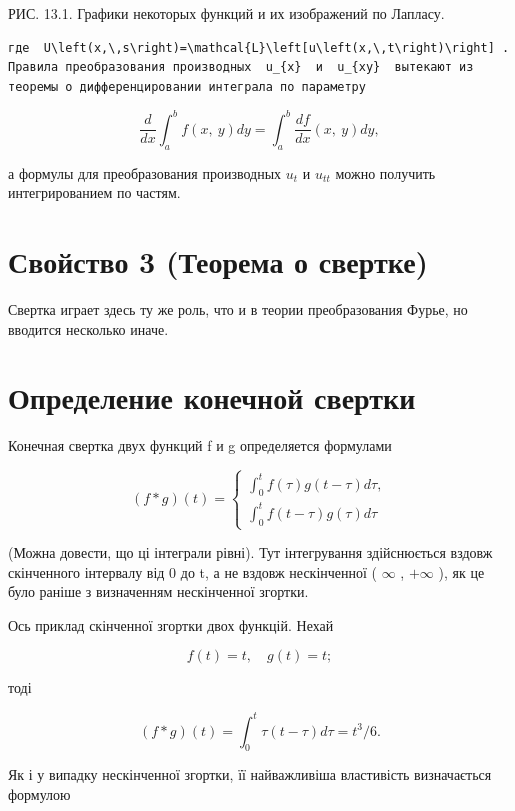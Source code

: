 \documentclass[
  ukrainian,
]{article}
\begin{document}
РИС. 13.1. Графики некоторых функций и их изображений по Лапласу.

\begin{verbatim}
где  U\left(x,\,s\right)=\mathcal{L}\left[u\left(x,\,t\right)\right] . Правила преобразования производных  u_{x}  и  u_{xy}  вытекают из теоремы о дифференцировании интеграла по параметру
\end{verbatim}

\[
\frac{d}{dx}\int_{a}^{b}f\left(x,\ y\right)dy=\int_{a}^{b}\frac{df}{dx}\left(x,\ y\right)dy,
\]

а формулы для преобразования производных \(u_t\) и \(u_{tt}\) можно
получить интегрированием по частям.

\section{Свойство 3 (Теорема о
свертке)}\label{ux441ux432ux43eux439ux441ux442ux432ux43e-3-ux442ux435ux43eux440ux435ux43cux430-ux43e-ux441ux432ux435ux440ux442ux43aux435}

Свертка играет здесь ту же роль, что и в теории преобразования Фурье, но
вводится несколько иначе.

\section{Определение конечной
свертки}\label{ux43eux43fux440ux435ux434ux435ux43bux435ux43dux438ux435-ux43aux43eux43dux435ux447ux43dux43eux439-ux441ux432ux435ux440ux442ux43aux438}

Конечная свертка двух функций f и g определяется формулами

\[
(f * g) (t) =
\begin{cases} \int_0^t f(\tau) g(t-\tau) d\tau, \\ \int_0^t f(t-\tau) g(\tau) d\tau \end{cases}
\]

(Можна довести, що ці інтеграли рівні). Тут інтегрування здійснюється
вздовж скінченного інтервалу від 0 до t, а не вздовж нескінченної (
\(\infty\) , \(+\infty\) ), як це було раніше з визначенням нескінченної
згортки.

Ось приклад скінченної згортки двох функцій. Нехай

\[
f(t) = t, \quad g(t) = t;
\]

тоді

\[
(f * g)(t) = \int_{0}^{t} \tau(t - \tau) d\tau = t^{3}/6.
\]

Як і у випадку нескінченної згортки, її найважливіша властивість
визначається формулою
\end{document}
